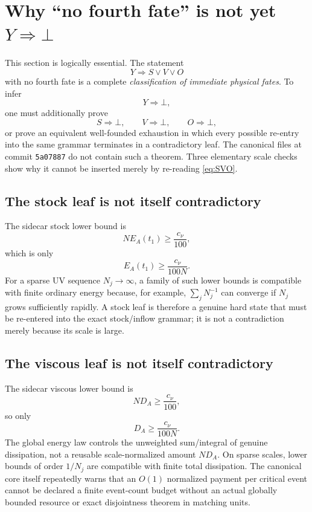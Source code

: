 \documentclass[11pt]{article}
\begin{document}
\section{Why ``no fourth fate'' is not yet $Y\Rightarrow\bot$}

This section is logically essential.  The statement
\[
Y\Longrightarrow S\vee V\vee O
\]
with no fourth fate is a complete \emph{classification of immediate physical fates}.  To infer
\[
Y\Longrightarrow\bot,
\]
one must additionally prove
\begin{equation}\label{eq:allleafbot}
S\Longrightarrow\bot,
\qquad
V\Longrightarrow\bot,
\qquad
O\Longrightarrow\bot,
\end{equation}
or prove an equivalent well-founded exhaustion in which every possible re-entry into the same grammar terminates in a contradictory leaf.  The canonical files at commit \texttt{5a07887} do not contain such a theorem.  Three elementary scale checks show why it cannot be inserted merely by re-reading \eqref{eq:SVO}.

\subsection{The stock leaf is not itself contradictory}

The sidecar stock lower bound is
\[
N E_A(t_1)\ge\frac{c_\nu}{100},
\]
which is only
\[
E_A(t_1)\ge\frac{c_\nu}{100N}.
\]
For a sparse UV sequence $N_j\to\infty$, a family of such lower bounds is compatible with finite ordinary energy because, for example, $\sum_jN_j^{-1}$ can converge if $N_j$ grows sufficiently rapidly.  A stock leaf is therefore a genuine hard state that must be re-entered into the exact stock/inflow grammar; it is not a contradiction merely because its scale is large.

\subsection{The viscous leaf is not itself contradictory}

The sidecar viscous lower bound is
\[
N D_A\ge\frac{c_\nu}{100},
\]
so only
\[
D_A\ge\frac{c_\nu}{100N}.
\]
The global energy law controls the unweighted sum/integral of genuine dissipation, not a reusable scale-normalized amount $ND_A$.  On sparse scales, lower bounds of order $1/N_j$ are compatible with finite total dissipation.  The canonical core itself repeatedly warns that an $O(1)$ normalized payment per critical event cannot be declared a finite event-count budget without an actual globally bounded resource or exact disjointness theorem in matching units.
\end{document}
